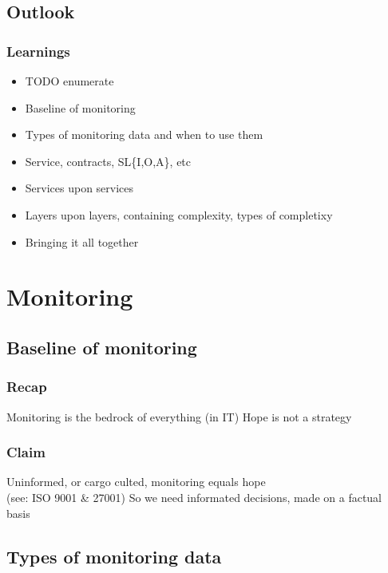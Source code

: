 \documentclass[t]{beamer}
\begin{document}
\subsection{Outlook}

\begin{frame}
	\frametitle{Learnings}
	\vfill
	\begin{itemize}
		\item TODO enumerate %

		\item Baseline of monitoring
		\item Types of monitoring data and when to use them

		\item Service, contracts, SL\{I,O,A\}, etc
		\item Services upon services

		\item Layers upon layers, containing complexity, types of completixy
		\item Bringing it all together
	\end{itemize}
	\vfill
\end{frame}



\section{Monitoring}


\subsection{Baseline of monitoring}

\begin{frame}
	\frametitle{Recap}
	\begin{center}
		\vfill
		Monitoring is the bedrock of everything (in IT)
		\vfill
		Hope is not a strategy
		\vfill
	\end{center}
\end{frame}

\begin{frame}
	\frametitle{Claim}
	\begin{center}
		\vfill
		Uninformed, or cargo culted, monitoring equals hope\\
		(see: ISO 9001 \& 27001)
		\vfill
		So we need informated decisions, made on a factual basis
		\vfill
	\end{center}
\end{frame}


\subsection{Types of monitoring data}
\end{document}
